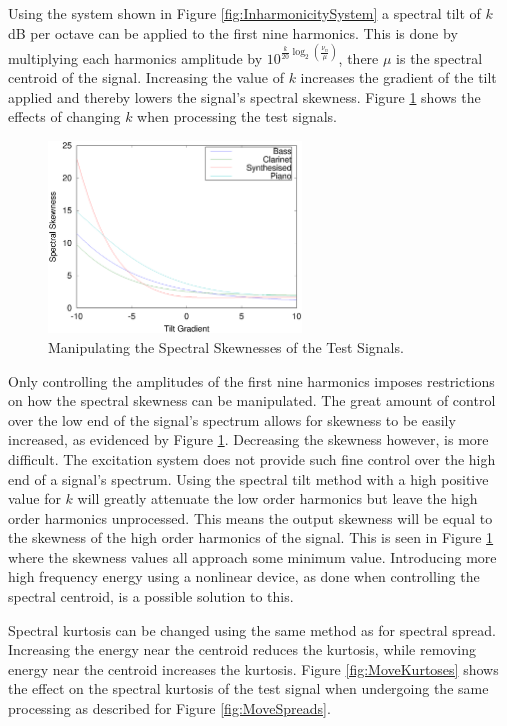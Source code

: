 			Using the system shown in Figure \ref{fig:InharmonicitySystem} a spectral tilt of $k$ dB per octave
			can be applied to the first nine harmonics. This is done by multiplying each harmonics amplitude by
			$10^{\frac{k}{20}\log_{2} \left( \frac{\nu_{n}}{\mu} \right)}$, there $\mu$ is the spectral
			centroid of the signal. Increasing the value of $k$ increases the gradient of the tilt applied and
			thereby lowers the signal's spectral skewness. Figure \ref{fig:MoveSkewnesses} shows the effects of
			changing $k$ when processing the test signals.

			\begin{figure}[h!]
				\centering
				\includegraphics[width=0.6\textwidth]{chapter6/Images/MoveSkewnesses.eps}
				\caption{Manipulating the Spectral Skewnesses of the Test Signals.}
				\label{fig:MoveSkewnesses}
			\end{figure}

			Only controlling the amplitudes of the first nine harmonics imposes restrictions on how the
			spectral skewness can be manipulated. The great amount of control over the low end of the signal's
			spectrum allows for skewness to be easily increased, as evidenced by Figure
			\ref{fig:MoveSkewnesses}.  Decreasing the skewness however, is more difficult. The excitation
			system does not provide such fine control over the high end of a signal's spectrum. Using the
			spectral tilt method with a high positive value for $k$ will greatly attenuate the low order
			harmonics but leave the high order harmonics unprocessed. This means the output skewness will be
			equal to the skewness of the high order harmonics of the signal. This is seen in Figure
			\ref{fig:MoveSkewnesses} where the skewness values all approach some minimum value. Introducing
			more high frequency energy using a nonlinear device, as done when controlling the spectral
			centroid, is a possible solution to this.

			Spectral kurtosis can be changed using the same method as for spectral spread. Increasing the
			energy near the centroid reduces the kurtosis, while removing energy near the centroid increases
			the kurtosis. Figure \ref{fig:MoveKurtoses} shows the effect on the spectral kurtosis of the test
			signal when undergoing the same processing as described for Figure \ref{fig:MoveSpreads}.
			
